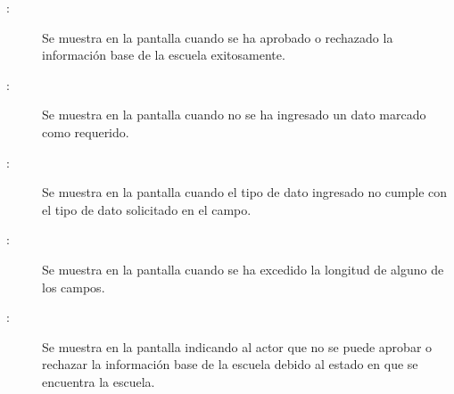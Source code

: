     \begin{description}
      
	     \item [:] Se muestra en la pantalla  cuando se ha aprobado o rechazado la información base de la escuela exitosamente.
	     
	     \item [:] Se muestra en la pantalla  cuando no se ha ingresado un dato marcado como requerido.
	    
	     \item [:] Se muestra en la pantalla  cuando el tipo de dato ingresado no cumple con el tipo de dato solicitado en el campo.
	    
	    \item [:] Se muestra en la pantalla  cuando se ha excedido la longitud de alguno de los campos.
	    
	    \item [:] Se muestra en la pantalla  indicando al actor que no se puede aprobar o rechazar la información base de la escuela debido al estado en que se encuentra la escuela. 
	    
    \end{description}

